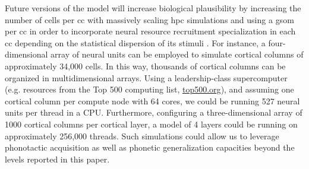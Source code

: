 \documentclass[10pt,letterpaper]{article}
\begin{document}
Future versions of the model will increase biological plausibility by increasing the number of cells per \gls{cc} with massively scaling \gls{hpc} simulations and using a \gls{gsom} per \gls{cc} in order to incorporate neural resource recruitment specialization in each \gls{cc} depending on the statistical dispersion of its stimuli \cite{Meyer19113}. For instance, a four-dimensional array of neural units can be employed to simulate cortical columns of approximately 34,000 cells. In this way, thousands of cortical columns can be organized in multidimensional arrays. Using a leadership-class supercomputer (e.g. resources from the Top 500 computing list, \url{top500.org}), and assuming one cortical column per compute node with 64 cores, we could be running 527 neural units per thread in a CPU. Furthermore, configuring a three-dimensional array of 1000 cortical columns per cortical layer, a model of 4 layers could be running on approximately 256,000 threads. Such simulations could allow us to leverage phonotactic acquisition as well as phonetic generalization capacities beyond the levels reported in this paper.









\end{document}
